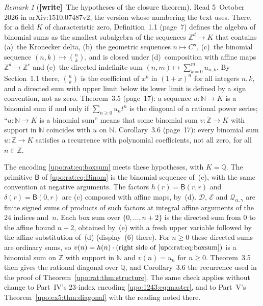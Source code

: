 \documentclass[11pt,letterpaper]{article}
\theoremstyle{remark}\newtheorem{remark}[theorem]{Remark}
\numberwithin{equation}{section}
\newcommand{\wtag}{\textup{\textbf{[write]}}}
\begin{document}
\begin{remark}[\wtag\ The hypotheses of the closure theorem]\label{upo:rat:rem:bls}
Read 5~October 2026 in arXiv:1510.07487v2, the version whose numbering the text uses. There, for a field $K$ of characteristic zero, Definition~1.1 (page~7) defines the algebra of binomial sums as the smallest subalgebra of the sequences $\mathbb Z^d\to K$ that contains (a)~the Kronecker delta, (b)~the geometric sequences $n\mapsto C^n$, (c)~the binomial sequence $(n,k)\mapsto\binom nk$, and is closed under (d)~composition with affine maps $\mathbb Z^d\to\mathbb Z^e$ and (e)~the directed indefinite sum $(n,m)\mapsto\sum_{k=0}^mu_{n,k}$. By Section~1.1 there, $\binom nk$ is the coefficient of $x^k$ in $(1+x)^n$ for all integers $n,k$, and a directed sum with upper limit below its lower limit is defined by a sign convention, not as zero. Theorem~3.5 (page~17): a sequence $u:\mathbb N\to K$ is a binomial sum if and only if $\sum_{n\ge0}u_nt^n$ is the diagonal of a rational power series; ``$u:\mathbb N\to K$ is a binomial sum'' means that some binomial sum $v:\mathbb Z\to K$ with support in $\mathbb N$ coincides with $u$ on $\mathbb N$. Corollary~3.6 (page~17): every binomial sum $u:\mathbb Z\to K$ satisfies a recurrence with polynomial coefficients, not all zero, for all $n\in\mathbb Z$.

The encoding \eqref{upo:rat:eq:boxsum} meets these hypotheses, with $K=\mathbb Q$. The primitive $\mathsf B$ of \eqref{upo:rat:eq:Binom} is the binomial sequence of~(c), with the same convention at negative arguments. The factors $h(r)=\mathsf B(r,r)$ and $\delta(r)=\mathsf B(0,r)$ are (c) composed with affine maps, by~(d). $\mathcal D$, $\mathcal E$ and $\mathcal Q_{\alpha,\gamma}$ are finite signed sums of products of such factors at integral affine arguments of the $24$ indices and~$n$. Each box sum over $\{0,\ldots,n+2\}$ is the directed sum from $0$ to the affine bound $n+2$, obtained by~(e) with a fresh upper variable followed by the affine substitution of~(d) (display~(6) there). For $n\ge0$ these directed sums are ordinary sums, so $v(n)=h(n)\cdot(\text{right side of \eqref{upo:rat:eq:boxsum}})$ is a binomial sum on $\mathbb Z$ with support in $\mathbb N$ and $v(n)=u_n$ for $n\ge0$. Theorem~3.5 then gives the rational diagonal over $\mathbb Q$, and Corollary~3.6 the recurrence used in the proof of Theorem~\ref{upo:rat:thm:structure}. The same check applies without change to Part~IV's $23$-index encoding \eqref{upo:1243:eq:master}, and to Part~V's Theorem~\ref{upo:ex5:thm:diagonal} with the reading noted there.
\end{remark}
\end{document}
